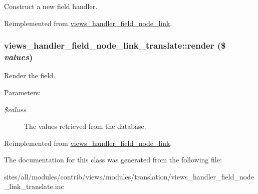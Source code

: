 Construct a new field handler. 

Reimplemented from \hyperlink{classviews__handler__field__node__link_c3f643ba7dd0435fc03c7bf477907484}{views\_\-handler\_\-field\_\-node\_\-link}.\hypertarget{classviews__handler__field__node__link__translate_887213a10a0090481e9001547cff8439}{
\subsubsection[{render}]{\setlength{\rightskip}{0pt plus 5cm}views\_\-handler\_\-field\_\-node\_\-link\_\-translate::render (\$ {\em values})}}
\label{classviews__handler__field__node__link__translate_887213a10a0090481e9001547cff8439}


Render the field.

\begin{Desc}
\item[Parameters:]
\begin{description}
\item[{\em \$values}]The values retrieved from the database. \end{description}
\end{Desc}


Reimplemented from \hyperlink{classviews__handler__field__node__link_9621ff38a6b318eb94f0c44fa2f711f5}{views\_\-handler\_\-field\_\-node\_\-link}.

The documentation for this class was generated from the following file:\begin{CompactItemize}
\item 
sites/all/modules/contrib/views/modules/translation/views\_\-handler\_\-field\_\-node\_\-link\_\-translate.inc\end{CompactItemize}

